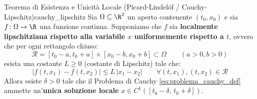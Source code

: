 \begin{teorema}{Teorema di Esistenza e Unicità Locale (Picard-Lindelöf / Cauchy-Lipschitz)}{cauchy_lipschitz}
Sia $\Omega \subseteq \R^2$ un aperto contenente $(t_0, x_0)$ e sia $f \colon \Omega \to \R$ una funzione continua. Supponiamo che $f$ sia \textbf{localmente lipschitziana rispetto alla variabile $x$ uniformemente rispetto a $t$}, ovvero che per ogni rettangolo chiuso:
\[
    \mathcal{R} = [t_0 - a, t_0 + a] \times [x_0 - b, x_0 + b] \subset \Omega \qquad (a > 0, b > 0)
\]
esista una costante $L \ge 0$ (costante di Lipschitz) tale che:
\begin{equation}
    \label{eq:lipschitz_condition}
    |f(t, x_1) - f(t, x_2)| \le L\, |x_1 - x_2| \qquad \forall (t, x_1), (t, x_2) \in \mathcal{R}
\end{equation}
Allora esiste $\delta > 0$ tale che il Problema di Cauchy \eqref{eq:problema_cauchy_def} ammette un'\textbf{unica soluzione locale} $x \in C^1([t_0 - \delta, \, t_0 + \delta])$.
\end{teorema}

